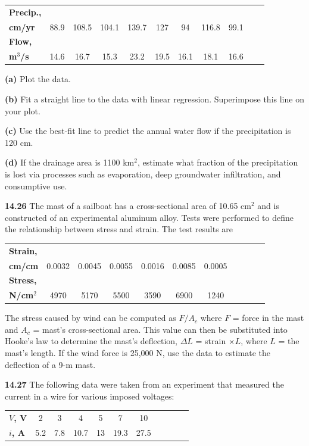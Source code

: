 \documentclass[../main.tex]{subfiles}
\begin{document}
\begin{multicols}{2}
	\noindent \begin{tabular}{l c c c c c c c c c c}
		\textbf{Precip.,} \\
		\textbf{cm/yr} & 88.9 & 108.5 & 104.1 & 139.7 & 127 & 94 & 116.8 & 99.1 \\
		\textbf{Flow,} \\
		\textbf{m$^3$/s} & 14.6 & 16.7 & 15.3 & 23.2 & 19.5 & 16.1 & 18.1 & 16.6
	\end{tabular}	

		\noindent \textbf{(a)} Plot the data.

	\noindent \textbf{(b)} Fit a straight line to the data with linear regression.
Superimpose this line on your plot.

	\noindent \textbf{(c)} Use the best-fit line to predict the annual water flow if
the precipitation is 120 cm.

	\noindent \textbf{(d)} If the drainage area is 1100 km$^2$, estimate what fraction
of the precipitation is lost via processes such as evaporation, deep groundwater infiltration, and consumptive
use.

	\noindent\textbf{14.26}  The mast of a sailboat has a cross-sectional area of
	10.65 cm$^2$ and is constructed of an experimental aluminum
	alloy. Tests were performed to define the relationship between stress and strain. The test results are

	\noindent \begin{tabular}{l c c c c c c c c c c}
		\textbf{Strain,} \\
		\textbf{cm/cm} & 0.0032 & 0.0045 & 0.0055 & 0.0016 & 0.0085 & 0.0005 \\
		\textbf{Stress,} \\
		\textbf{N/cm$^2$} & 4970 & 5170 & 5500 & 3590 & 6900 & 1240
	\end{tabular}

	\noindent The stress caused by wind can be computed as $F/A_c$ where $F$ = force in the mast and $A_c$ = mast's cross-sectional area. This value can then be substituted into Hooke's law to determine the mast's deflection, $\Delta L$ = strain $\times L$, where $L$ = the mast's length. If the wind force is 25,000 N, use the data to estimate the deflection of a 9-m mast.

	\noindent\textbf{14.27} The following data were taken from an experiment
	that measured the current in a wire for various imposed voltages:

	\noindent \begin{tabular}{l c c c c c c c c c c}
		\textbf{$V$, V} & 2 & 3 & 4 & 5 & 7 & 10 \\
		\textbf{$i$, A} & 5.2 & 7.8 & 10.7 & 13 & 19.3 & 27.5
	\end{tabular}


\end{multicols}
\end{document}
